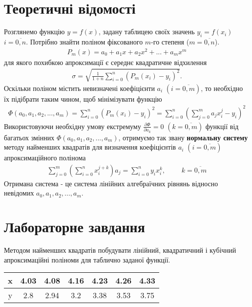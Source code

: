 \documentclass{article}
\begin{document}
\begin{large}
		\section*{Теоретичні відомості}
		Розглянемо функцію $y=f(x)$, задану таблицею своїх значень $y_i=f(x_i)$ $i=\overline{0,n}$. Потрібно знайти поліном фіксованого $m$-го степеня ($m=\overline{0,n}$).
		\begin{gather}
			P_m(x)=a_0+a_1x+a_2x^2+...+a_mx^m\nonumber
		\end{gather}
		для якого похибкою апроксимації є середнє квадратичне відхилення
		\begin{gather}
			\sigma=\sqrt{\frac{1}{1+n}\sum_{i=0}^{n}(P_m(x_i)-y_i)^2}.\nonumber
		\end{gather}
		Оскільки поліном містить невизначені коефіцієнти $a_i$ $(i=\overline{0,m})$, то необхідно їх підібрати таким чином, щоб мінімізувати функцію
		\begin{gather}
			\varPhi(a_0,a_1,a_2,...,a_m)=\sum_{i=0}^{n}(P_m(x_i)-y_i)^2=\sum_{i=0}^{n}(\sum_{j=0}^{m}a_jx_i^j-y_i)^2\nonumber
		\end{gather}
		Використовуючи необхідну умову екстремуму $\frac{\partial\varPhi}{\partial a_k}=0$ $(k=\overline{0,m})$ функції від багатьох змінних $\varPhi(a_0,a_1,a_2,...,a_m)$, отримуємо так звану \textbf{нормальну систему} методу найменших квадратів для визначення коефіцієнтів $a_i$ $(i=\overline{0,m})$ апроксимаційного полінома
		\begin{gather}
			\sum_{j=0}^{m}(\sum_{i=0}^{n}x_i^{j+k})a_j=\sum_{i=0}^{n}y_ix_i^k,\hspace{28pt}k=\overline{0,m}\nonumber
		\end{gather}
		Отримана система - це система лінійних алгебраїчних рівнянь відносно невідомих $a_0,a_1,a_2,...,a_m$.
		
		\section*{Лабораторне завдання}
		Методом найменших квадратів побудувати лінійний, квадратичний і
		кубічний апроксимаційні поліноми для таблично заданої функції.
		\vspace{5pt}
		
		\begin{tabular}{|c|c|c|c|c|c|c|}
			\hline
			x & 4.03 & 4.08 & 4.16 & 4.23 & 4.26 & 4.33\\
			\hline
			y & 2.8 & 2.94 & 3.2 & 3.38 & 3.53 & 3.75\\
			\hline
		\end{tabular}
	

\end{large}
\end{document}
